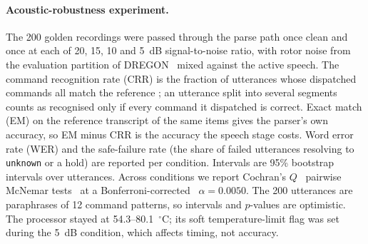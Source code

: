 \documentclass[a4paper,fleqn]{cas-dc}
\begin{document}
\paragraph{Acoustic-robustness experiment.} The 200 golden recordings were passed through the parse
path once clean and once at each of 20, 15, 10 and 5~dB signal-to-noise ratio, with rotor noise from
the evaluation partition of DREGON~\citep{dregon} mixed against the active speech. The command
recognition rate (CRR) is the fraction of utterances whose dispatched commands all match the
reference ; an utterance split into several
segments counts as recognised only if every command it dispatched is correct. Exact match (EM) on
the reference transcript of the same items gives the parser's own accuracy, so EM minus CRR is the
accuracy the speech stage costs. Word error rate (WER) and the safe-failure rate (the share of failed
utterances resolving to \texttt{unknown} or a hold) are reported per condition. Intervals are 95\%
bootstrap intervals over utterances. Across conditions we report Cochran's
$Q$~\citep{cochran1950} pairwise McNemar tests~\citep{mcnemar1947} at a Bonferroni-corrected~\citep{dunn1961}
$\alpha = 0.0050$. The 200 utterances are paraphrases of 12 command patterns, so intervals and
$p$-values are optimistic. The processor stayed at 54.3--80.1~$^\circ$C; its soft temperature-limit flag was set during the 5~dB condition, which affects timing, not accuracy.
\end{document}
